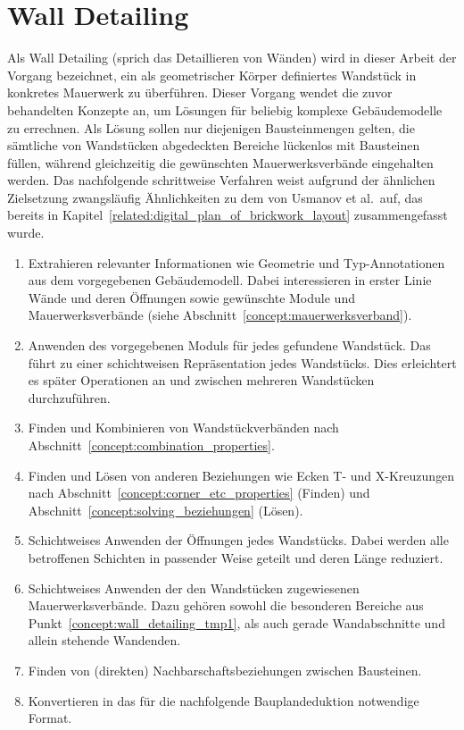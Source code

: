 \section{Wall Detailing}\label{concept:wall_detailing}
Als \glqq{}Wall Detailing\grqq{} (sprich das \glqq{}Detaillieren von Wänden\grqq{}) wird in dieser Arbeit der Vorgang bezeichnet, ein als geometrischer Körper definiertes Wandstück in konkretes Mauerwerk zu überführen.
Dieser Vorgang wendet die zuvor behandelten Konzepte an, um Lösungen für beliebig komplexe Gebäudemodelle zu errechnen.
Als Lösung sollen nur diejenigen Bausteinmengen gelten, die sämtliche von Wandstücken abgedeckten Bereiche lückenlos mit Bausteinen füllen, während gleichzeitig die gewünschten Mauerwerksverbände eingehalten werden.
Das nachfolgende schrittweise Verfahren weist aufgrund der ähnlichen Zielsetzung zwangsläufig Ähnlichkeiten zu dem von Usmanov et al.\ auf, das bereits in Kapitel~\ref{related:digital_plan_of_brickwork_layout} zusammengefasst wurde.

\begin{enumerate}
    \item Extrahieren relevanter Informationen wie Geometrie und Typ-Annotationen aus dem vorgegebenen Gebäudemodell. Dabei interessieren in erster Linie Wände und deren Öffnungen sowie gewünschte Module und Mauerwerksverbände (siehe Abschnitt~\ref{concept:mauerwerksverband}).
    \item Anwenden des vorgegebenen Moduls für jedes gefundene Wandstück. Das führt zu einer schichtweisen Repräsentation jedes Wandstücks. Dies erleichtert es später Operationen an und zwischen mehreren Wandstücken durchzuführen.
    \item Finden und Kombinieren von Wandstückverbänden nach Abschnitt~\ref{concept:combination_properties}.
    \item\label{concept:wall_detailing_tmp1} Finden und Lösen von anderen Beziehungen wie Ecken T- und X-Kreuzungen nach Abschnitt~\ref{concept:corner_etc_properties} (Finden) und Abschnitt~\ref{concept:solving_beziehungen} (Lösen).
    \item Schichtweises Anwenden der Öffnungen jedes Wandstücks. Dabei werden alle betroffenen Schichten in passender Weise geteilt und deren Länge reduziert.
    \item Schichtweises Anwenden der den Wandstücken zugewiesenen Mauerwerksverbände. Dazu gehören sowohl die besonderen Bereiche aus Punkt~\ref{concept:wall_detailing_tmp1}, als auch gerade Wandabschnitte und allein stehende Wandenden.
    \item\label{concept:wall_detailing_tmp2} Finden von (direkten) Nachbarschaftsbeziehungen zwischen Bausteinen.
    \item Konvertieren in das für die nachfolgende Bauplandeduktion notwendige Format.
\end{enumerate}

